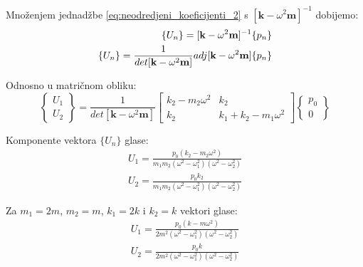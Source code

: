 \documentclass{rgn}
\newcommand\mm{\mathbf{m}}
\newcommand\kk{\mathbf{k}}
\begin{document}
%

Množenjem jednadžbe \eqref{eq:neodredjeni_koeficijenti_2} s $[\kk-\omega^2\mm]^{-1}$
dobijemo:
\begin{equation}
    \begin{split}
        \{U_n\}=[\kk-\omega^2\mm]^{-1}\{p_n\} \notag\\
        \{U_n\}=\frac{1}{det[\kk-\omega^2\mm]}adj[\kk-\omega^2\mm]\{p_n\}\label{eqneodredjeni_koeficijenti_3}
    \end{split}
\end{equation}

Odnosno u matričnom obliku:
\begin{equation}
    \begin{Bmatrix}
        U_1\\
        U_2
    \end{Bmatrix}
    =
    \frac{1}{det[\kk-\omega^2\mm]}
        \begin{bmatrix}
            k_2-m_2\omega^2 & k_2\\
            k_2 & k_1+k_2-m_1\omega^2
        \end{bmatrix}
        \begin{Bmatrix}
            p_0\\
            0
        \end{Bmatrix}
\end{equation}

Komponente vektora $\{U_n\}$ glase:
\begin{align}
    U_1=\frac{p_0(k_2-m_2\omega^2)}{m_1m_2(\omega^2-\omega_1^2)(\omega^2-\omega_2^2)} \label{eq:vtor_1_opce}\\
    U_2=\frac{p_0k_2}{m_1m_2(\omega^2-\omega_1^2)(\omega^2-\omega_2^2)}\label{eq:vtor_2_opce}
\end{align}

Za $m_1=2m$, $m_2=m$, $k_1=2k$ i $k_2=k$ vektori glase:
\begin{align}
    U_1=\frac{p_0(k-m\omega^2)}{2m^2(\omega^2-\omega_1^2)(\omega^2-\omega_2^2)}\label{eq:vtor_1}\\
    U_2=\frac{p_0k}{2m^2(\omega^2-\omega_1^2)(\omega^2-\omega_2^2)}\label{eq:vtor_2}
\end{align}
\end{document}
